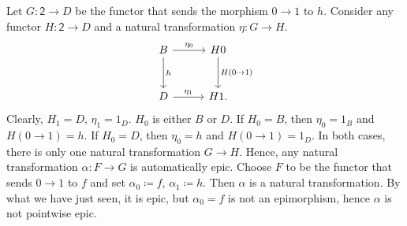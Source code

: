 Let $G\colon \mathsf{2}\to D$ be the functor that sends the morphism
$0\to 1$ to $h$. Consider any functor $H\colon \mathsf{2}\to D$ and
a natural transformation $\eta\colon G\to H$.
\[\begin{tikzcd}[row sep=1cm, column sep=1cm]
	B\ar[r, "\eta_0"]\ar[d, "h"] & H0\ar[d, "H(0\to 1)"]\\
	D\ar[r, "\eta_1"]& H1.
\end{tikzcd}\]
Clearly, $H_1 = D$, $\eta_1 = 1_D$.
$H_0$ is either $B$ or $D$. If $H_0 = B$, then $\eta_0 = 1_B$ and $H(0\to 1) = h$.
If $H_0 = D$, then $\eta_0 = h$ and $H(0\to 1) = 1_D$. In both cases,
there is only one natural transformation $G\to H$. Hence, any natural transformation
$\alpha\colon F\to G$ is automatically epic. Choose $F$ to be the functor that
sends $0\to 1$ to $f$ and set $\alpha_0 \coloneqq f$, $\alpha_1\coloneqq h$. Then
$\alpha$ is a natural transformation. By what we have just seen, it is epic,
but $\alpha_0 = f$ is not an epimorphism, hence $\alpha$ is not pointwise epic.

